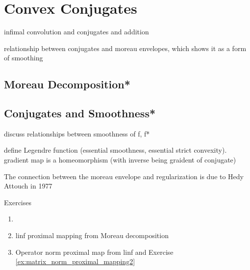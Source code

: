 \chapter{Convex Conjugates}
\label{chap:convex_conjugates}

infimal convolution and conjugates and addition

relationship between conjugates and moreau envelopes, which shows it as a form
of smoothing 

\section{Moreau Decomposition*}
\label{sec:moreau_decomposition}

\section{Conjugates and Smoothness*}
\label{sec:conjugates_smoothness}

discuss relationships between smoothness of f, f* 

define Legendre function (essential smoothness, essential strict convexity).
gradient map is a homeomorphism (with inverse being graident of conjugate) 

The connection between the moreau envelope and regularization is due to Hedy
Attouch in 1977  


\begin{xcb}{Exercises}
\begin{enumerate}[label=\thechapter.\arabic*]
\settowidth{\leftmargini}{0.00.\hskip\labelsep}
\item \label{ex:conjugates_smoothness}

\item linf proximal mapping from Moreau decomposition

\item Operator norm proximal map from linf and Exercise
  \ref{ex:matrix_norm_proximal_mapping2}   

\end{enumerate}
\end{xcb}
